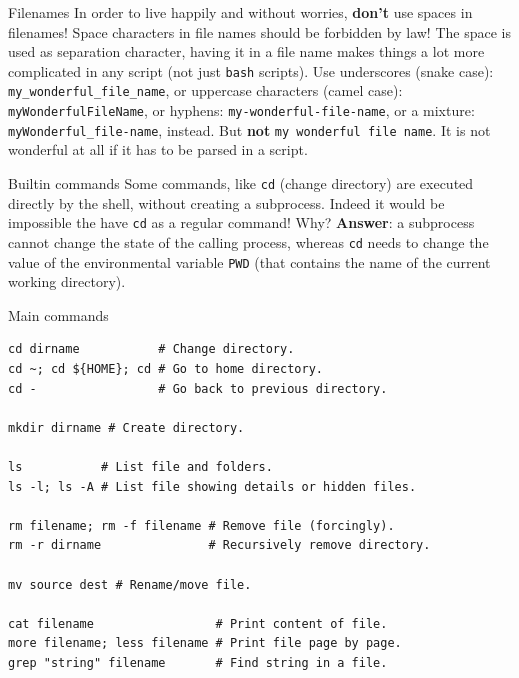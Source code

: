 \documentclass{beamer}
\begin{document}
\begin{frame}{Filenames}
In order to live happily and without worries, \textbf{don't} use spaces in filenames!
\vfill
Space characters in file names should be forbidden by law! The space is used as separation character, having it in a file name makes things a lot more complicated in any script (not just \texttt{bash} scripts).
\vfill
Use underscores (snake case): \texttt{my\_wonderful\_file\_name}, or uppercase characters (camel case): \texttt{myWonderfulFileName}, or hyphens: \texttt{my-wonderful-file-name}, or a mixture:
\texttt{myWonderful\_file-name}, instead.
\vfill
But \textbf{not} \texttt{my wonderful file name}. It is not wonderful at all if it has to be parsed in a script.
\end{frame}

\begin{frame}{Builtin commands}
Some commands, like \texttt{cd} (change directory) are executed directly by the shell, without creating a subprocess.
\vfill
Indeed it would be impossible the have \texttt{cd} as a regular command! Why?
\vfill
\pause
\textbf{Answer}: a subprocess cannot change the state of the calling process, whereas \texttt{cd} needs to change the value of the environmental
variable \texttt{PWD} (that contains the name of the current working directory).
\end{frame}

\begin{frame}[fragile]{Main commands}
\begin{lstlisting}
cd dirname           # Change directory.
cd ~; cd ${HOME}; cd # Go to home directory.
cd -                 # Go back to previous directory.

mkdir dirname # Create directory.

ls           # List file and folders.
ls -l; ls -A # List file showing details or hidden files.

rm filename; rm -f filename # Remove file (forcingly).
rm -r dirname               # Recursively remove directory.

mv source dest # Rename/move file.

cat filename                 # Print content of file.
more filename; less filename # Print file page by page.
grep "string" filename       # Find string in a file.
\end{lstlisting}
\end{frame}
\end{document}

